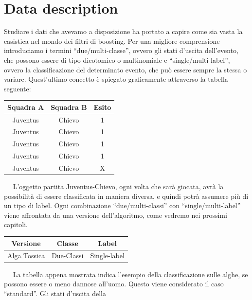 \newpage
\vspace{1.5cm}
\section{Data description}
Studiare i dati che avevamo a disposizione ha portato a capire come sia vasta la casistica nel mondo dei 
filtri di boosting. Per una migliore comprensione introduciamo i termini ``due/multi-classe'', ovvero gli 
stati d'uscita dell'evento, che possono essere di tipo dicotomico o multinomiale e 
``single/multi-label'', ovvero la classificazione del 
determinato evento, che pu\`o essere sempre la stessa o variare. Quest'ultimo concetto 
\`e spiegato graficamente attraverso la tabella seguente:\\
\newline
\begin{table}[!h]
\centering
\begin{tabular}{|c|c|c|}
\hline
Squadra A&Squadra B&Esito\\
\hline
Juventus&Chievo&1\\
\hline
Juventus&Chievo&1\\
\hline
Juventus&Chievo&1\\
\hline
Juventus&Chievo&1\\
\hline
Juventus&Chievo&X\\
\hline
\end{tabular}
\end{table}
\ \
\newline
L'oggetto partita Juventus-Chievo, ogni volta che sar\`a giocata, avr\`a la 
possibilit\`a di essere classificata in maniera diversa, e quindi potr\`a assumere 
pi\`u di un tipo di label.
Ogni combinazione ``due/multi-classi'' con ``single/multi-label'' viene affrontata da 
una versione dell'algoritmo, come vedremo
nei prossimi capitoli. \\
\newline
\begin{table}[!h]
\centering
\begin{tabular}{|c|c|c|}
\hline
Versione&Classe&Label\\
\hline
Alga Tossica&Due-Classi&Single-label\\
\hline
\end{tabular}
\end{table}
\ \
\newline
La tabella appena mostrata indica l'esempio della classificazione sulle alghe, se 
possono essere o meno dannose all'uomo.
Questo viene considerato il caso ``standard''. Gli stati d'uscita della 
